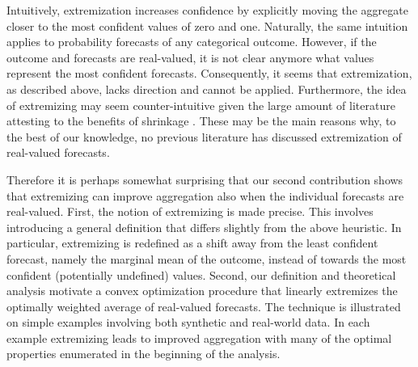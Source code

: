 \documentclass[12pt]{article}
\theoremstyle{definition}
\theoremstyle{definition}
\begin{document}
Intuitively, extremization increases confidence by explicitly moving the aggregate closer to  the most confident values of zero and one. 
Naturally, the same intuition applies to probability forecasts of any categorical outcome. 
    However, if the outcome and forecasts are real-valued, it is not clear anymore what values represent the most confident forecasts. Consequently, it seems that extremization, as described above, lacks direction and cannot be applied. 
%    
Furthermore, the idea of extremizing may seem counter-intuitive given the large amount of literature attesting to the benefits of shrinkage \citep{james1961estimation}.  These may be the main reasons why, to the best of our knowledge, no previous literature has discussed extremization of real-valued forecasts. 
    
    
   Therefore it is perhaps somewhat surprising that our second contribution shows that extremizing can improve aggregation also when the individual forecasts are real-valued. First, the notion of extremizing is made precise. This involves introducing a general definition that differs slightly from the above heuristic.    
        In particular, extremizing is redefined as a shift away from the least confident forecast, namely the marginal mean of the outcome, instead of towards the most confident (potentially undefined) values.  
%      
%      
Second, our definition and theoretical analysis motivate a convex optimization procedure that linearly extremizes the optimally weighted average of real-valued forecasts.
  The technique is illustrated on simple examples involving both synthetic and real-world data. In each example extremizing leads to improved aggregation with many of the optimal properties enumerated in the beginning of the analysis.
\end{document}
